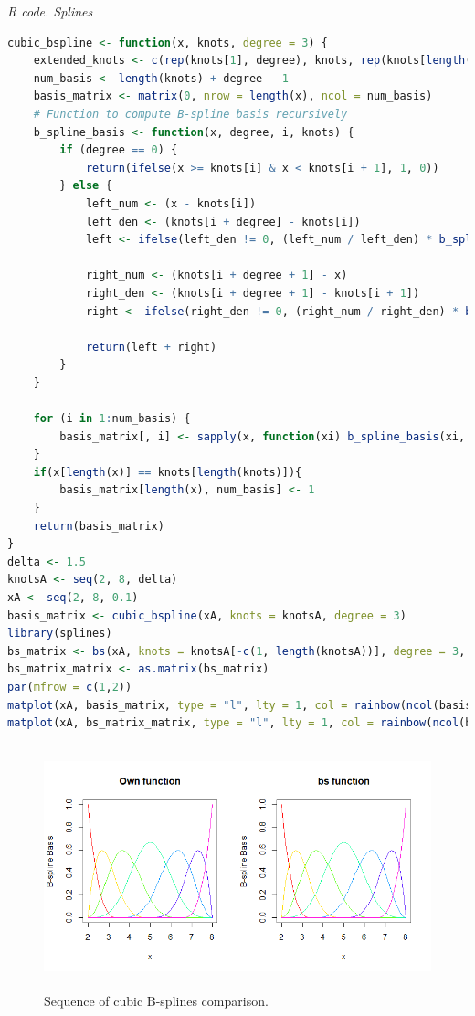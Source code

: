 \begin{tcolorbox}[enhanced,width=4.67in,center upper,
	fontupper=\large\bfseries,drop shadow southwest,sharp corners]
	\textit{R code. Splines}
	\begin{VF}
		\begin{lstlisting}[language=R]
cubic_bspline <- function(x, knots, degree = 3) {
	extended_knots <- c(rep(knots[1], degree), knots, rep(knots[length(knots)], degree))
	num_basis <- length(knots) + degree - 1  
	basis_matrix <- matrix(0, nrow = length(x), ncol = num_basis)
	# Function to compute B-spline basis recursively
	b_spline_basis <- function(x, degree, i, knots) {
		if (degree == 0) {
			return(ifelse(x >= knots[i] & x < knots[i + 1], 1, 0))
		} else {
			left_num <- (x - knots[i])
			left_den <- (knots[i + degree] - knots[i])
			left <- ifelse(left_den != 0, (left_num / left_den) * b_spline_basis(x, degree - 1, i, knots), 0)
			
			right_num <- (knots[i + degree + 1] - x)
			right_den <- (knots[i + degree + 1] - knots[i + 1])
			right <- ifelse(right_den != 0, (right_num / right_den) * b_spline_basis(x, degree - 1, i + 1, knots), 0)
			
			return(left + right)
		}
	}
	
	for (i in 1:num_basis) {
		basis_matrix[, i] <- sapply(x, function(xi) b_spline_basis(xi, degree, i, extended_knots))
	}
	if(x[length(x)] == knots[length(knots)]){
		basis_matrix[length(x), num_basis] <- 1
	}
	return(basis_matrix)
}
delta <- 1.5
knotsA <- seq(2, 8, delta)
xA <- seq(2, 8, 0.1)
basis_matrix <- cubic_bspline(xA, knots = knotsA, degree = 3)
library(splines)
bs_matrix <- bs(xA, knots = knotsA[-c(1, length(knotsA))], degree = 3, intercept = TRUE, Boundary.knots = range(knotsA))
bs_matrix_matrix <- as.matrix(bs_matrix)
par(mfrow = c(1,2))
matplot(xA, basis_matrix, type = "l", lty = 1, col = rainbow(ncol(basis_matrix)), ylab = "B-spline Basis", xlab = "x", main = "Own function")
matplot(xA, bs_matrix_matrix, type = "l", lty = 1, col = rainbow(ncol(basis_matrix)), ylab = "B-spline Basis", xlab = "x", main = "bs function")
\end{lstlisting}
	\end{VF}
\end{tcolorbox}

\begin{figure}[!h]
	\includegraphics[width=340pt, height=200pt]{Chapters/chapter11/figures/Bsplines.png}
	\caption[List of figure caption goes here]{Sequence of cubic B-splines comparison.}\label{figBsplines}
\end{figure}

